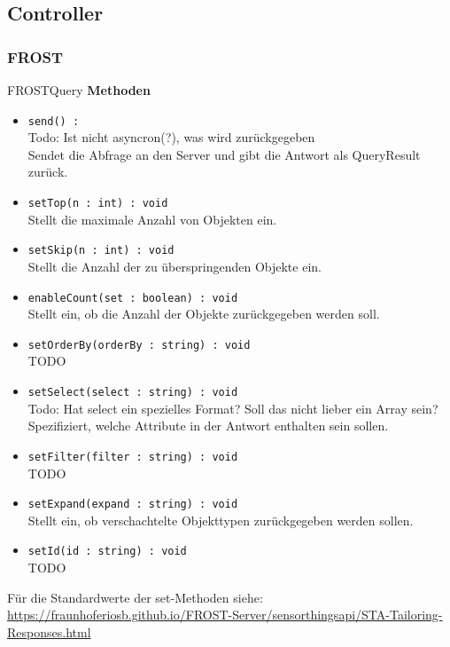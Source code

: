 \subsection{Controller}

\subsubsection{FROST}

\begin{Class}{FROSTQuery}
    \textbf{Methoden}
    \begin{itemize}
        \item \texttt{send() : }
        \\ Todo: Ist nicht asyncron(?), was wird zurückgegeben
        \\Sendet die Abfrage an den Server und gibt die Antwort als QueryResult zurück.
        \item \texttt{setTop(n : int) : void}
        \\Stellt die maximale Anzahl von Objekten ein.
        \item \texttt{setSkip(n : int) : void}
        \\Stellt die Anzahl der zu überspringenden Objekte ein.
        \item \texttt{enableCount(set : boolean) : void}
        \\Stellt ein, ob die Anzahl der Objekte zurückgegeben werden soll.
        \item \texttt{setOrderBy(orderBy : string) : void}
        \\TODO
        \item \texttt{setSelect(select : string) : void}
	\\Todo: Hat select ein spezielles Format? Soll das nicht lieber ein Array sein?
        \\Spezifiziert, welche Attribute in der Antwort enthalten sein sollen.
        \item \texttt{setFilter(filter : string) : void}
        \\TODO
        \item \texttt{setExpand(expand : string) : void}
        \\Stellt ein, ob verschachtelte Objekttypen zurückgegeben werden sollen.
        \item \texttt{setId(id : string) : void}
        \\TODO
    \end{itemize}
    Für die Standardwerte der set-Methoden siehe: \url{https://fraunhoferiosb.github.io/FROST-Server/sensorthingsapi/STA-Tailoring-Responses.html}
\end{Class}

